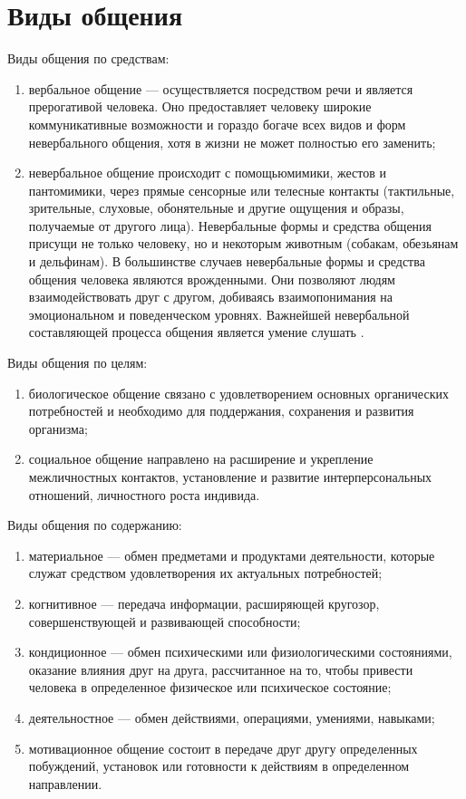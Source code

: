 \section{Виды общения}
Виды общения по средствам: 
\begin{enumerate}
	\item вербальное общение — осуществляется посредством речи и является прерогативой человека. Оно предоставляет человеку широкие коммуникативные возможности и гораздо богаче всех видов и форм невербального общения, хотя в жизни не может полностью его заменить;
	\item невербальное общение происходит с помощьюмимики, жестов и пантомимики, через прямые сенсорные или телесные контакты (тактильные, зрительные, слуховые, обонятельные и другие ощущения и образы, получаемые от другого лица). Невербальные формы и средства общения присущи не только человеку, но и некоторым животным (собакам, обезьянам и дельфинам). В большинстве случаев невербальные формы и средства общения человека являются врожденными. Они позволяют людям взаимодействовать друг с другом, добиваясь взаимопонимания на эмоциональном и поведенческом уровнях. Важнейшей невербальной составляющей процесса общения является умение слушать \cite{13}.
\end{enumerate}
 
Виды общения по целям:
\begin{enumerate}
	\item биологическое общение связано с удовлетворением основных органических потребностей и необходимо для поддержания, сохранения и развития организма;
	\item социальное общение направлено на расширение и укрепление межличностных контактов, установление и развитие интерперсональных отношений, личностного роста индивида.
\end{enumerate}

Виды общения по содержанию:
\begin{enumerate}
	\item материальное — обмен предметами и продуктами деятельности, которые служат средством удовлетворения их актуальных потребностей;
	\item когнитивное — передача информации, расширяющей кругозор, совершенствующей и развивающей способности;
	\item кондиционное — обмен психическими или физиологическими состояниями, оказание влияния друг на друга, рассчитанное на то, чтобы привести человека в определенное физическое или психическое состояние;
	\item деятельностное — обмен действиями, операциями, умениями, навыками;
	\item мотивационное общение состоит в передаче друг другу определенных побуждений, установок или готовности к действиям в определенном направлении. 
\end{enumerate}

